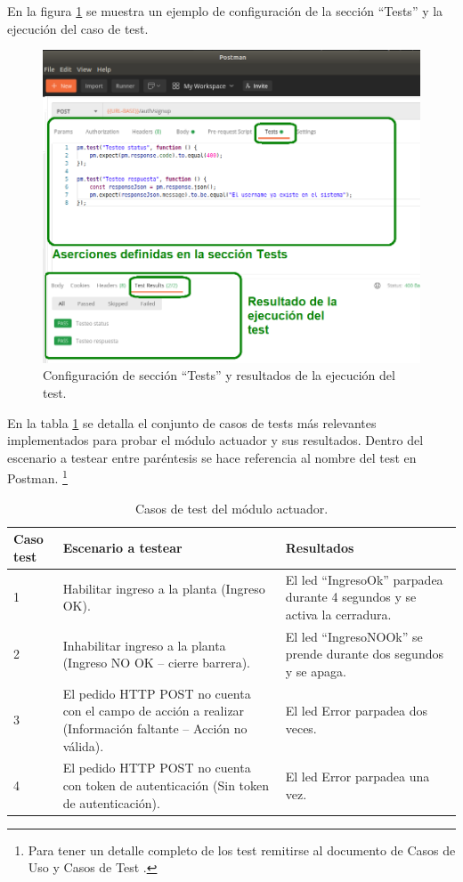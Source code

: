En la figura \ref{fig:PostmanAsercion} se muestra un ejemplo de configuración de la sección ``Tests'' y la ejecución del caso de test.

\begin{figure}[ht]
	\centering
	\includegraphics[width=1\textwidth]{./Figures/PostmanAsercion.png}
	\caption{Configuración de sección ``Tests'' y resultados de la ejecución del test.}
	\label{fig:PostmanAsercion}
\end{figure}

En la tabla  \ref{tab:tablaTestNodActuador} se detalla el conjunto de casos de tests más relevantes implementados para probar el módulo actuador y sus resultados. Dentro del escenario a testear entre paréntesis se hace referencia al nombre del test en Postman. \footnote{Para tener un detalle completo de los test remitirse al documento de Casos de Uso y Casos de Test \citep{WEBSITE:CasosUsoYTest}.}

\begin{table}[h]
	\centering
	\caption[Tipos de pruebas actuador]{Casos de test del módulo actuador.}
	\begin{tabular}{p{1.5cm} p{6.5cm} p{4.5cm}} 	

		\toprule
		\textbf{Caso test} & 
		\textbf{Escenario a testear} & 
		\textbf{Resultados} 
		\\
		\midrule
1 & Habilitar ingreso a la planta (Ingreso OK). & El led ``IngresoOk'' parpadea durante 4 segundos y se activa la cerradura. \\
2 & Inhabilitar ingreso a la planta (Ingreso NO OK – cierre barrera).	& El led ``IngresoNOOk'' se prende durante dos segundos y se apaga. \\
3 & El pedido HTTP POST no cuenta con el campo de acción a realizar (Información faltante – Acción no válida). & El led Error parpadea dos veces. \\
4 & El pedido HTTP POST no cuenta con token de autenticación (Sin token de autenticación). & El led Error parpadea una vez. \\	   
		\bottomrule
		\hline
	\end{tabular}
	\label{tab:tablaTestNodActuador}
\end{table}

